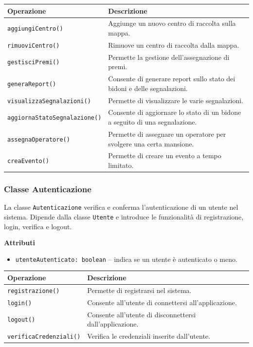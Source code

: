 \documentclass[12pt,a4paper]{article}
\begin{document}
\begin{table}[H]
\centering
\begin{tabularx}{\textwidth}{@{}lX@{}}
\toprule
\textbf{Operazione} & \textbf{Descrizione} \\ \midrule
\texttt{aggiungiCentro()} & Aggiunge un nuovo centro di raccolta sulla mappa. \\
\texttt{rimuoviCentro()} & Rimuove un centro di raccolta dalla mappa. \\
\texttt{gestisciPremi()} & Permette la gestione dell'assegnazione di premi. \\
\texttt{generaReport()} & Consente di generare report sullo stato dei bidoni e delle segnalazioni. \\
\texttt{visualizzaSegnalazioni()} & Permette di visualizzare le varie segnalazioni. \\   
\texttt{aggiornaStatoSegnalazione()} & Consente di aggiornare lo stato di un bidone a seguito di una segnalazione. \\
\texttt{assegnaOperatore()} & Permette di assegnare un operatore per svolgere una certa mansione. \\
\texttt{creaEvento()} & Permette di creare un evento a tempo limitato. \\
\bottomrule
\end{tabularx}
\end{table}

\subsubsection{Classe Autenticazione}
La classe \texttt{Autenticazione} verifica e conferma l'autenticazione di un utente nel sistema. 
Dipende dalla classe \texttt{Utente} e introduce le funzionalità di registrazione, login, verifica e logout.

\textbf{Attributi}
\begin{itemize}
    \item \texttt{utenteAutenticato: boolean} -- indica se un utente è autenticato o meno.
\end{itemize}

\begin{table}[H]
\centering
\begin{tabularx}{\textwidth}{@{}lX@{}}
\toprule
\textbf{Operazione} & \textbf{Descrizione} \\ \midrule
\texttt{registrazione()} & Permette di registrarsi nel sistema. \\
\texttt{login()} & Consente all'utente di connettersi all'applicazione. \\
\texttt{logout()} & Consente all'utente di disconnettersi dall'applicazione. \\
\texttt{verificaCredenziali()} & Verifica le credenziali inserite dall'utente. \\
\bottomrule
\end{tabularx}
\end{table}
\end{document}
